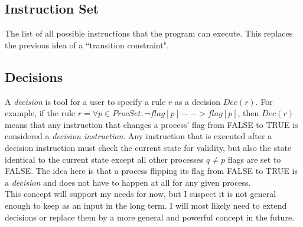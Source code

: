 \documentclass[12pt]{article}
\begin{document}
\subsection{Instruction Set}
The list of all possible instructions that the program can execute.  This replaces the previous idea of a ``transition constraint".  

\subsection{Decisions}
A \textit{decision} is tool for a user to specify a rule $r$ as a decision $Dec(r)$.  For example, if the rule $r= \forall p \in ProcSet : \lnot flag[p] --> flag[p]$, then $Dec(r)$ means that any instruction that changes a process' flag from FALSE to TRUE is considered a \textit{decision instruction}.  Any instruction that is executed after a decision instruction must check the current state for validity, but also the state identical to the current state except all other processes $q \neq p$ flags are set to FALSE.  The idea here is that a process flipping its flag from FALSE to TRUE is a \textit{decision} and does not have to happen at all for any given process.  \\

This concept will support my needs for now, but I suspect it is not general enough to keep as an input in the long term.  I will most likely need to extend decisions or replace them by a more general and powerful concept in the future.  
\end{document}
